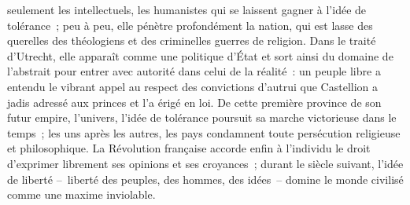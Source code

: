\documentclass[french,twoside]{book} %
\newcommand{\astermono}{\medskip\centerline{\color{rubric}\large\selectfont{\syms ✻}}\medskip\par}%
\begin{document}
seulement les intellectuels, les humanistes qui se laissent gagner à l’idée de tolérance ; peu à peu, elle pénètre profondément la nation, qui est lasse des querelles des théologiens et des criminelles guerres de religion. Dans le traité d’Utrecht, elle apparaît comme une politique d’État et sort ainsi du domaine de l’abstrait pour entrer avec autorité dans celui de la réalité : un peuple libre a entendu le vibrant appel au respect des convictions d’autrui que Castellion a jadis adressé aux princes et l’a érigé en loi. De cette première province de son futur empire, l’univers, l’idée de tolérance poursuit sa marche victorieuse dans le temps ; les uns après les autres, les pays condamnent toute persécution religieuse et philosophique. La Révolution française accorde enfin à l’individu le droit d’exprimer librement ses opinions et ses croyances ; durant le siècle suivant, l’idée de liberté – liberté des peuples, des hommes, des idées – domine le monde civilisé comme une maxime inviolable.\par

\astermono
\end{document}

